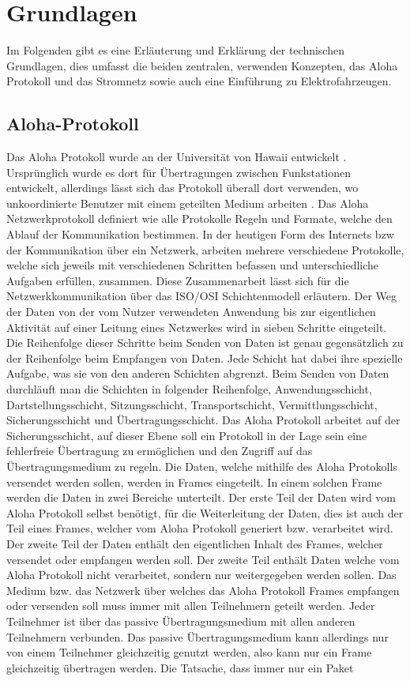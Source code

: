 \chapter{Grundlagen}
\label{chap:grundlagen}
Im Folgenden gibt es eine Erläuterung und Erklärung der technischen Grundlagen, dies umfasst die beiden zentralen, verwenden Konzepten, das Aloha Protokoll und das Stromnetz sowie auch eine Einführung zu Elektrofahrzeugen.

\section{Aloha-Protokoll}
\label{capBack:Aloha}
Das Aloha Protokoll wurde an der Universität von Hawaii entwickelt \cite{aloha_firstsource}. Ursprünglich wurde es dort für Übertragungen zwischen Funkstationen entwickelt, allerdings lässt sich das Protokoll überall dort verwenden, wo unkoordinierte Benutzer mit einem geteilten Medium arbeiten \cite{Back_AlohaPure}. Das Aloha Netzwerkprotokoll definiert wie alle Protokolle Regeln und Formate, welche den Ablauf der Kommunikation bestimmen. In der heutigen Form des Internets bzw der Kommunikation über ein Netzwerk, arbeiten mehrere verschiedene Protokolle, welche sich jeweils mit verschiedenen Schritten befassen und unterschiedliche Aufgaben erfüllen, zusammen. Diese Zusammenarbeit lässt sich für die Netzwerkkommunikation über das ISO/OSI Schichtenmodell erläutern. Der Weg der Daten von der vom Nutzer verwendeten Anwendung bis zur eigentlichen Aktivität auf einer Leitung eines Netzwerkes wird in sieben Schritte eingeteilt. Die Reihenfolge dieser Schritte beim Senden von Daten ist genau gegensätzlich zu der Reihenfolge beim Empfangen von Daten. Jede Schicht hat dabei ihre spezielle Aufgabe, was sie von den anderen Schichten abgrenzt. Beim Senden von Daten durchläuft man die Schichten in folgender Reihenfolge, Anwendungsschicht, Dartstellungsschicht, Sitzungsschicht, Transportschicht, Vermittlungsschicht, Sicherungsschicht und Übertragungsschicht. Das Aloha Protokoll arbeitet auf der Sicherungsschicht, auf dieser Ebene soll ein Protokoll in der Lage sein eine fehlerfreie Übertragung zu ermöglichen und den Zugriff auf das Übertragungsmedium zu regeln. Die Daten, welche mithilfe des Aloha Protokolls versendet werden sollen, werden in Frames eingeteilt. In einem solchen Frame werden die Daten in zwei Bereiche unterteilt. Der erste Teil der Daten wird vom Aloha Protokoll selbst benötigt, für die Weiterleitung der Daten, dies ist auch der Teil eines Frames, welcher vom Aloha Protokoll generiert bzw. verarbeitet wird. Der zweite Teil der Daten enthält den eigentlichen Inhalt des Frames, welcher versendet oder empfangen werden soll. Der zweite Teil enthält Daten welche vom Aloha Protokoll nicht verarbeitet, sondern nur weitergegeben werden sollen. Das Medium bzw. das Netzwerk über welches das Aloha Protokoll Frames empfangen oder versenden soll muss immer mit allen Teilnehmern geteilt werden. Jeder Teilnehmer ist über das passive Übertragungsmedium mit allen anderen Teilnehmern verbunden. Das passive Übertragungsmedium kann allerdings nur von einem Teilnehmer gleichzeitig genutzt werden, also kann nur ein Frame gleichzeitig übertragen werden. Die Tatsache, dass immer nur ein Paket 